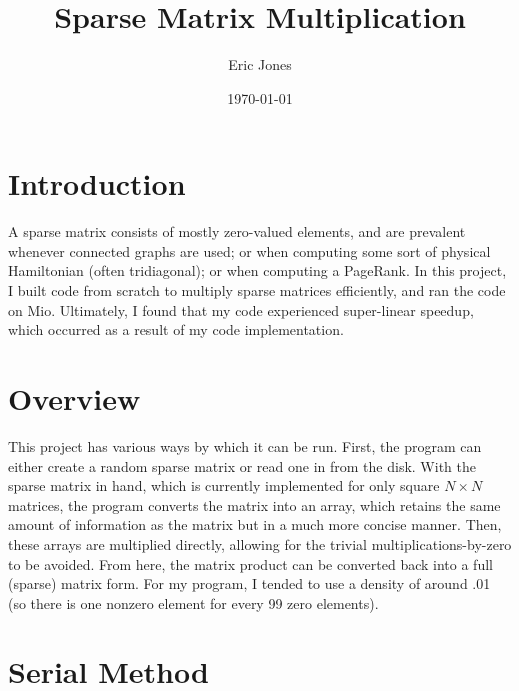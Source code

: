 \documentclass{article}
\title{Sparse Matrix Multiplication}
\author{Eric Jones}
\date{\today}
\begin{document}
\maketitle


\section{Introduction}

A sparse matrix consists of mostly zero-valued elements, and are prevalent
whenever connected graphs are used; or when computing some sort of physical
Hamiltonian (often tridiagonal); or when computing a PageRank. In this project,
I built code from scratch to multiply sparse matrices efficiently, and ran the
code on Mio. Ultimately, I found that my code experienced super-linear speedup,
which occurred as a result of my code implementation. \\

\section{Overview}

This project has various ways by which it can be run. First, the program can
either create a random sparse matrix or read one in from the disk. With the
sparse matrix in hand, which is currently implemented for only square $N\times N$
matrices, the program converts the matrix into an array, which retains the same
amount of information as the matrix but in a much more concise manner. Then,
these arrays are multiplied directly, allowing for the trivial
multiplications-by-zero to be avoided. From here, the matrix product can be
converted back into a full (sparse) matrix form. For my
program, I tended to use a density of around .01 (so there is one nonzero
element for every 99 zero elements).

\section{Serial Method}
\end{document}
